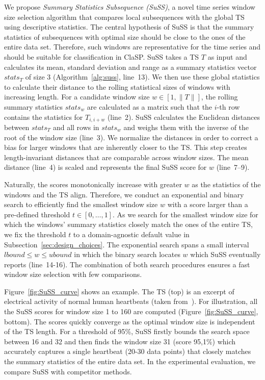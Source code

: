 \documentclass[pdflatex,sn-basic]{sn-jnl}
\begin{document}
We propose \textit{Summary Statistics Subsequence (SuSS)}, a novel time series window size selection algorithm that compares local subsequences with the global TS using descriptive statistics. The central hypothesis of SuSS is that the summary statistics of subsequences with optimal size should be close to the ones of the entire data set. Therefore, such windows are representative for the time series and should be suitable for classification in ClaSP. SuSS takes a TS $T$ as input and calculates its mean, standard deviation and range as a summary statistics vector $stats_T$ of size 3 (Algorithm~\ref{alg:suss}, line~13). We then use these global statistics to calculate their distance to the rolling statistical sizes of windows with increasing length. For a candidate window size $w \in [1, \|T\|]$, the rolling summary statistics $stats_w$ are calculated as a matrix such that the $i$-th row contains the statistics for $T_{i,i+w}$ (line~2). SuSS calculates the Euclidean distances between $stats_T$ and all rows in $stats_w$ and weighs them with the inverse of the root of the window size (line~3). We normalize the distances in order to correct a bias for larger windows that are inherently closer to the TS. This step creates length-invariant distances that are comparable across window sizes. The mean distance (line~4) is scaled and represents the final SuSS score for $w$ (line~7--9). 

Naturally, the scores monotonically increase with greater $w$ as the statistics of the windows and the TS align. Therefore, we conduct an exponential and binary search to efficiently find the smallest window size $w$ with a score larger than a pre-defined threshold $t \in [0,\dots,1]$. As we search for the smallest window size for which the windows' summary statistics closely match the ones of the entire TS, we fix the threshold $t$ to a domain-agnostic default value in Subsection~\ref{sec:design_choices}. The exponential search spans a small interval $lbound \leq w \leq ubound$ in which the binary search locates $w$ which SuSS eventually reports (line~14-16). The combination of both search procedures ensures a fast window size selection with few comparisons. 

Figure~\ref{fig:SuSS_curve} shows an example. The TS (top) is an excerpt of electrical activity of normal human heartbeats (taken from~\citep{UCRClassification}). For illustration, all the SuSS scores for window size 1 to 160 are computed (Figure~\ref{fig:SuSS_curve}, bottom). The scores quickly converge as the optimal window size is independent of the TS length. For a threshold of 95\%, SuSS firstly bounds the search space between 16 and 32 and then finds the window size 31 (score 95,1\%) which accurately captures a single heartbeat (20-30 data points) that closely matches the summary statistics of the entire data set. In the experimental evaluation, we compare SuSS with competitor methods. 
\end{document}
